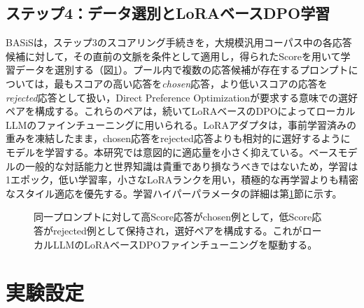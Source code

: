 \documentclass[manuscript,review,anonymous]{acmart}
\begin{document}
\subsection{ステップ4：データ選別とLoRAベースDPO学習}
BASiSは，ステップ3のスコアリング手続きを，大規模汎用コーパス中の各応答候補に対して，その直前の文脈を条件として適用し，得られたScoreを用いて学習データを選別する（図\ref{fig:selection}）。プール内で複数の応答候補が存在するプロンプトについては，最もスコアの高い応答を\emph{chosen}応答，より低いスコアの応答を\emph{rejected}応答として扱い，Direct Preference Optimizationが要求する意味での選好ペアを構成する\cite{rafailov2023dpo}。これらのペアは，続いてLoRAベースのDPO\cite{hu2021lora}によってローカルLLMのファインチューニングに用いられる。LoRAアダプタは，事前学習済みの重みを凍結したまま，chosen応答をrejected応答よりも相対的に選好するようにモデルを学習する。本研究では意図的に適応量を小さく抑えている。ベースモデルの一般的な対話能力と世界知識は貴重であり損なうべきではないため，学習は1エポック，低い学習率，小さなLoRAランクを用い，積極的な再学習よりも精密なスタイル適応を優先する。学習ハイパーパラメータの詳細は第\ref{sec:setup}節に示す。

\begin{figure}[t]
  \centering
  \caption{同一プロンプトに対して高Score応答がchosen例として，低Score応答がrejected例として保持され，選好ペアを構成する。これがローカルLLMのLoRAベースDPOファインチューニングを駆動する。}
  \label{fig:selection}
\end{figure}


\section{実験設定}
\label{sec:setup}
\end{document}

